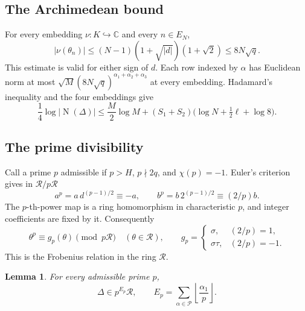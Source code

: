 \documentclass[11pt,a4paper]{amsart}
\newtheorem{lemma}[theorem]{Lemma}
\theoremstyle{remark}
\newcommand{\C}{\mathbb C}
\newcommand{\cR}{\mathcal R}
\newcommand{\cP}{\mathcal P}
\DeclareMathOperator{\Nm}{N}
\numberwithin{equation}{section}
\begin{document}
\subsection*{The Archimedean bound}
For every embedding $\nu:K\hookrightarrow\C$ and every $n\in E_N$,
\[
 |\nu(\theta_n)|
 \le(N-1)(1+\sqrt{|d|})(1+\sqrt2)
 \le8N\sqrt q.
\]
This estimate is valid for either sign of $d$. Each row indexed by
$\alpha$ has Euclidean norm at most
$\sqrt M(8N\sqrt q)^{\alpha_1+\alpha_2+\alpha_3}$ at every embedding.
Hadamard's inequality and the four embeddings give
\begin{equation}\label{eq:upper}
 \frac14\log|\Nm(\Delta)|
 \le\frac M2\log M+
 (S_1+S_2)\bigl(\log N+\tfrac12\ell+\log8\bigr).
\end{equation}

\subsection*{The prime divisibility}
Call a prime $p$ admissible if
$p>H$, $p\nmid2q$, and $\chi(p)=-1$. Euler's criterion gives
in $\cR/p\cR$
\[
 a^p=a\,d^{(p-1)/2}\equiv-a,
 \qquad b^p=b\,2^{(p-1)/2}\equiv(2/p)b.
\]
The $p$-th-power map is a ring homomorphism in characteristic $p$,
and integer coefficients are fixed by it. Consequently
\begin{equation}\label{eq:frobenius}
 \theta^p\equiv g_p(\theta)\pmod{p\cR}
 \quad(\theta\in\cR),\qquad
 g_p=\begin{cases}\sigma,&(2/p)=1,\\
                   \sigma\tau,&(2/p)=-1.
       \end{cases}
\end{equation}
This is the Frobenius relation in the ring $\cR$.

\begin{lemma}\label{lem:divisibility}
For every admissible prime $p$,
\begin{equation}\label{eq:divisibility}
 \Delta\in p^{E_p}\cR,
 \qquad E_p=\sum_{\alpha\in\cP}\left\lfloor\frac{\alpha_1}{p}\right\rfloor.
\end{equation}
\end{lemma}
\end{document}

